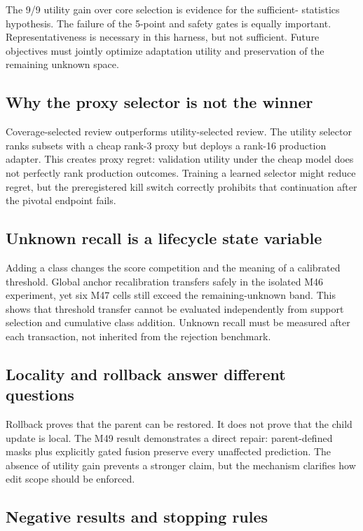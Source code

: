 \documentclass[10pt]{article}
\begin{document}
The 9/9 utility gain over core selection is evidence for the sufficient-
statistics hypothesis. The failure of the 5-point and safety gates is equally
important. Representativeness is necessary in this harness, but not sufficient.
Future objectives must jointly optimize adaptation utility and preservation of
the remaining unknown space.

\subsection{Why the proxy selector is not the winner}

Coverage-selected review outperforms utility-selected review. The utility
selector ranks subsets with a cheap rank-3 proxy but deploys a rank-16
production adapter. This creates proxy regret: validation utility under the
cheap model does not perfectly rank production outcomes. Training a learned
selector might reduce regret, but the preregistered kill switch correctly
prohibits that continuation after the pivotal endpoint fails.

\subsection{Unknown recall is a lifecycle state variable}

Adding a class changes the score competition and the meaning of a calibrated
threshold. Global anchor recalibration transfers safely in the isolated M46
experiment, yet six M47 cells still exceed the remaining-unknown band. This
shows that threshold transfer cannot be evaluated independently from support
selection and cumulative class addition. Unknown recall must be measured after
each transaction, not inherited from the rejection benchmark.

\subsection{Locality and rollback answer different questions}

Rollback proves that the parent can be restored. It does not prove that the
child update is local. The M49 result demonstrates a direct repair:
parent-defined masks plus explicitly gated fusion preserve every unaffected
prediction. The absence of utility gain prevents a stronger claim, but the
mechanism clarifies how edit scope should be enforced.

\subsection{Negative results and stopping rules}
\end{document}
